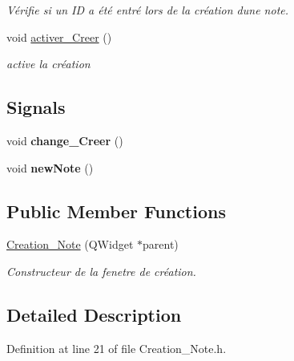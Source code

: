 \begin{DoxyCompactItemize}
\begin{DoxyCompactList}\small\item\em Vérifie si un ID a été entré lors de la création d\textquotesingle{}une note. \end{DoxyCompactList}\item 
\mbox{\label{class_creation___note_a95923bfacb52c2bfc279c56be61284f4}} 
void \hyperlink{class_creation___note_a95923bfacb52c2bfc279c56be61284f4}{activer\+\_\+\+Creer} ()
\begin{DoxyCompactList}\small\item\em active la création \end{DoxyCompactList}\end{DoxyCompactItemize}
\subsection*{Signals}
\begin{DoxyCompactItemize}
\item 
\mbox{\label{class_creation___note_ac077793d8161d266c9d500c6545da80e}} 
void {\bfseries change\+\_\+\+Creer} ()
\item 
\mbox{\label{class_creation___note_a2aff8e8867c9fed096afbeaa56f3dcdb}} 
void {\bfseries new\+Note} ()
\end{DoxyCompactItemize}
\subsection*{Public Member Functions}
\begin{DoxyCompactItemize}
\item 
\hyperlink{class_creation___note_a76278cf9f0de87cd61f204aafcebd5d2}{Creation\+\_\+\+Note} (Q\+Widget $\ast$parent)
\begin{DoxyCompactList}\small\item\em Constructeur de la fenetre de création. \end{DoxyCompactList}\end{DoxyCompactItemize}


\subsection{Detailed Description}


Definition at line 21 of file Creation\+\_\+\+Note.\+h.



